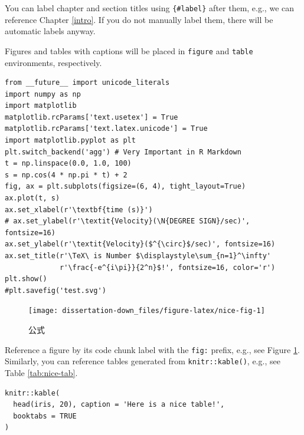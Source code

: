 \documentclass[hyperref, a4paper, UTF8, zihao = -4, linespread = 1.3, table,
notitlepage]{book}
\begin{document}
You can label chapter and section titles using \texttt{\{\#label\}}
after them, e.g., we can reference Chapter \ref{intro}. If you do not
manually label them, there will be automatic labels anyway.

Figures and tables with captions will be placed in \texttt{figure} and
\texttt{table} environments, respectively.

\begin{verbatim}
from __future__ import unicode_literals
import numpy as np
import matplotlib
matplotlib.rcParams['text.usetex'] = True
matplotlib.rcParams['text.latex.unicode'] = True
import matplotlib.pyplot as plt
plt.switch_backend('agg') # Very Important in R Markdown
t = np.linspace(0.0, 1.0, 100)
s = np.cos(4 * np.pi * t) + 2
fig, ax = plt.subplots(figsize=(6, 4), tight_layout=True)
ax.plot(t, s)
ax.set_xlabel(r'\textbf{time (s)}')
# ax.set_ylabel(r'\textit{Velocity}(\N{DEGREE SIGN}/sec)', fontsize=16)
ax.set_ylabel(r'\textit{Velocity}($^{\circ}$/sec)', fontsize=16)
ax.set_title(r'\TeX\ is Number $\displaystyle\sum_{n=1}^\infty'
             r'\frac{-e^{i\pi}}{2^n}$!', fontsize=16, color='r')
plt.show()
#plt.savefig('test.svg') 
\end{verbatim}

\begin{figure}

{\centering \texttt{[image: dissertation-down\_files/figure-latex/nice-fig-1]} 

}

\caption{公式}\label{fig:nice-fig}
\end{figure}

Reference a figure by its code chunk label with the \texttt{fig:}
prefix, e.g., see Figure \ref{fig:nice-fig}. Similarly, you can
reference tables generated from \texttt{knitr::kable()}, e.g., see Table
\ref{tab:nice-tab}.

\begin{verbatim}
knitr::kable(
  head(iris, 20), caption = 'Here is a nice table!',
  booktabs = TRUE
)
\end{verbatim}
\end{document}
